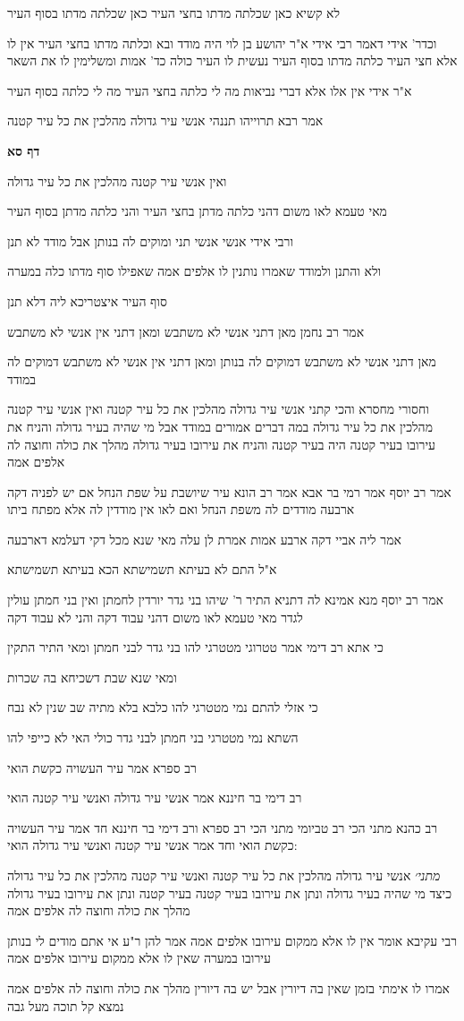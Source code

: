 \documentclass[12pt, openany]{book}
\newcommand{\sethebfont}{
\fontsize{10.5pt}{21.0pt} \selectfont
}
\newcommand{\textblock}[1]{
{\sethebfont #1\\}	
}
\newcommand{\sectname}{}
\newcommand{\newsection}[1]{
	\addcontentsline{toc}{section}{#1}
	\renewcommand{\sectname}{#1}	
	\vspace{-\baselineskip}
	\begin{center}
		\textbf{%
\fontsize{16pt}{16pt}\selectfont
			#1}
	\end{center}
	\vspace{-\baselineskip}
	\nopagebreak
}
\begin{document}
\textblock{לא קשיא כאן שכלתה מדתו בחצי העיר כאן שכלתה מדתו בסוף העיר}
\textblock{וכדר' אידי דאמר רבי אידי א"ר יהושע בן לוי היה מודד ובא וכלתה מדתו בחצי העיר אין לו אלא חצי העיר כלתה מדתו בסוף העיר נעשית לו העיר כולה כד' אמות ומשלימין לו את השאר}
\textblock{א"ר אידי אין אלו אלא דברי נביאות מה לי כלתה בחצי העיר מה לי כלתה בסוף העיר}
\textblock{אמר רבא תרוייהו תננהי אנשי עיר גדולה מהלכין את כל עיר קטנה}
\newsection{דף סא}
\textblock{ואין אנשי עיר קטנה מהלכין את כל עיר גדולה}
\textblock{מאי טעמא לאו משום דהני כלתה מדתן בחצי העיר והני כלתה מדתן בסוף העיר}
\textblock{ורבי אידי אנשי אנשי תני ומוקים לה בנותן אבל מודד לא תנן}
\textblock{ולא והתנן ולמודד שאמרו נותנין לו אלפים אמה שאפילו סוף מדתו כלה במערה}
\textblock{סוף העיר איצטריכא ליה דלא תנן}
\textblock{אמר רב נחמן מאן דתני אנשי לא משתבש ומאן דתני אין אנשי לא משתבש}
\textblock{מאן דתני אנשי לא משתבש דמוקים לה בנותן ומאן דתני אין אנשי לא משתבש דמוקים לה במודד}
\textblock{וחסורי מחסרא והכי קתני אנשי עיר גדולה מהלכין את כל עיר קטנה ואין אנשי עיר קטנה מהלכין את כל עיר גדולה במה דברים אמורים במודד אבל מי שהיה בעיר גדולה והניח את עירובו בעיר קטנה היה בעיר קטנה והניח את עירובו בעיר גדולה מהלך את כולה וחוצה לה אלפים אמה}
\textblock{אמר רב יוסף אמר רמי בר אבא אמר רב הונא עיר שיושבת על שפת הנחל אם יש לפניה דקה ארבעה מודדים לה משפת הנחל ואם לאו אין מודדין לה אלא מפתח ביתו}
\textblock{אמר ליה אביי דקה ארבע אמות אמרת לן עלה מאי שנא מכל דקי דעלמא דארבעה}
\textblock{א"ל התם לא בעיתא תשמישתא הכא בעיתא תשמישתא}
\textblock{אמר רב יוסף מנא אמינא לה דתניא התיר ר' שיהו בני גדר יורדין לחמתן ואין בני חמתן עולין לגדר מאי טעמא לאו משום דהני עבוד דקה והני לא עבוד דקה}
\textblock{כי אתא רב דימי אמר טטרוגי מטטרגי להו בני גדר לבני חמתן ומאי התיר התקין}
\textblock{ומאי שנא שבת דשכיחא בה שכרות}
\textblock{כי אזלי להתם נמי מטטרגי להו כלבא בלא מתיה שב שנין לא נבח}
\textblock{השתא נמי מטטרגי בני חמתן לבני גדר כולי האי לא כייפי להו}
\textblock{רב ספרא אמר עיר העשויה כקשת הואי}
\textblock{רב דימי בר חיננא אמר אנשי עיר גדולה ואנשי עיר קטנה הואי}
\textblock{רב כהנא מתני הכי רב טביומי מתני הכי רב ספרא ורב דימי בר חיננא חד אמר עיר העשויה כקשת הואי וחד אמר אנשי עיר קטנה ואנשי עיר גדולה הואי:}
\textblock{{\large\emph{מתני׳}} אנשי עיר גדולה מהלכין את כל עיר קטנה ואנשי עיר קטנה מהלכין את כל עיר גדולה כיצד מי שהיה בעיר גדולה ונתן את עירובו בעיר קטנה בעיר קטנה ונתן את עירובו בעיר גדולה מהלך את כולה וחוצה לה אלפים אמה}
\textblock{רבי עקיבא אומר אין לו אלא ממקום עירובו אלפים אמה אמר להן ר"ע אי אתם מודים לי בנותן עירובו במערה שאין לו אלא ממקום עירובו אלפים אמה}
\textblock{אמרו לו אימתי בזמן שאין בה דיורין אבל יש בה דיורין מהלך את כולה וחוצה לה אלפים אמה נמצא קל תוכה מעל גבה}
\end{document}
